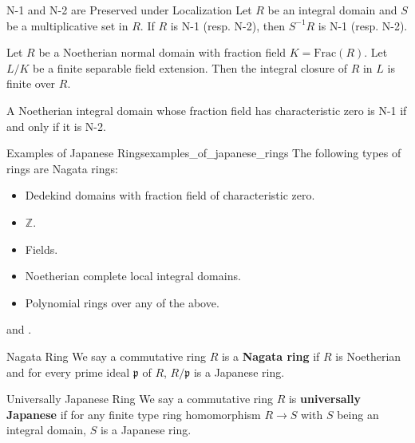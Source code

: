 \begin{proposition}{N-1 and N-2 are Preserved under Localization}{}
    Let $R$ be an integral domain and $S$ be a multiplicative set in $R$. If $R$ is N-1 (resp. N-2), then $S^{-1}R$ is N-1 (resp. N-2).
\end{proposition}

\begin{proposition}{}{}
    Let $R$ be a Noetherian normal domain with fraction field $K=\mathrm{Frac}(R)$. Let $L/K$ be a finite separable field extension. Then the integral closure of $R$ in $L$ is finite over $R$.
\end{proposition}

\begin{proposition}{}{}
    A Noetherian integral domain whose fraction field has characteristic zero is N-1 if and only if it is N-2.
\end{proposition}

\begin{example}{Examples of Japanese Rings}{examples_of_japanese_rings}
    The following types of rings are Nagata rings:
    \begin{itemize}
        \item Dedekind domains with fraction field of characteristic zero.
        \item $\mathbb{Z}$.
        \item Fields.
        \item Noetherian complete local integral domains.
        \item Polynomial rings over any of the above.
    \end{itemize}
\end{example}
\begin{prf}
     and .
\end{prf}

\begin{definition}{Nagata Ring}{}
    We say a commutative ring $R$ is a \textbf{Nagata ring} if $R$ is Noetherian and for every prime ideal $\mathfrak{p}$ of $R$, $R/\mathfrak{p}$ is a Japanese ring.
\end{definition}

\begin{definition}{Universally Japanese Ring}{}
    We say a commutative ring $R$ is \textbf{universally Japanese} if for any finite type ring homomorphism $R\to S$ with $S$ being an integral domain, $S$ is a Japanese ring.
\end{definition}

